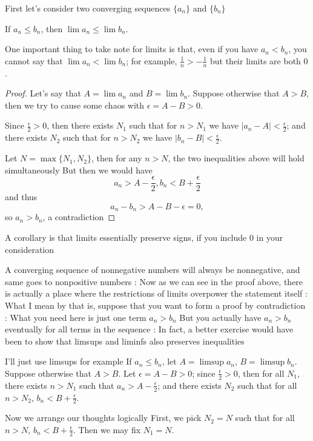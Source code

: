 First let's consider two converging sequences $\{a_n\}$ and $\{b_n\}$

If $a_n \le b_n$, then $\lim a_n \le \lim b_n$.

\begin{remark}
One important thing to take note for limits is that, even if you have $a_n<b_n$, you cannot say that $\lim a_n<\lim b_n$; for example, $\frac{1}{n}>-\frac{1}{n}$ but their limits are both $0$.
\end{remark}

\begin{proof}
Let's say that $A=\lim a_n$ and $B=\lim b_n$. Suppose otherwise that $A>B$, then we try to cause some chaos with $\epsilon=A-B>0$.

Since $\frac{\epsilon}{2}>0$, then there exists $N_1$ such that for $n>N_1$ we have $|a_n-A|<\frac{\epsilon}{2}$; and there exists $N_2$ such that for $n>N_2$ we have $|b_n-B|<\frac{\epsilon}{2}$.

Let $N=\max\{N_1,N_2\}$, then for any $n>N$, the two inequalities above will hold simultaneously
But then we would have
\[ a_n>A-\frac{\epsilon}{2}, b_n<B+\frac{\epsilon}{2} \]
and thus
\[ a_n-b_n>A-B-\epsilon=0, \]
so $a_n>b_n$, a contradiction
\end{proof}

A corollary is that limits essentially preserve signs, if you include 0 in your consideration

A converging sequence of nonnegative numbers will always be nonnegative, and same goes to nonpositive numbers
:
Now as we can see in the proof above, there is actually a place where the restrictions of limits overpower the statement itself
:
What I mean by that is, suppose that you want to form a proof by contradiction
:
What you need here is just one term $a_n>b_n$
But you actually have $a_n>b_n$ eventually for all terms in the sequence
:
In fact, a better exercise would have been to show that limsups and liminfs also preserves inequalities

I'll just use limsups for example
If $a_n\le b_n$, let $A=\limsup a_n$, $B=\limsup b_n$. Suppose otherwise that $A>B$. Let $\epsilon=A-B>0$; since $\frac{\epsilon}{2}>0$, then for all $N_1$, there exists $n>N_1$ such that $a_n>A-\frac{\epsilon}{2}$; and there exists $N_2$ such that for all $n>N_2$, $b_n<B+\frac{\epsilon}{2}$.

Now we arrange our thoughts logically
First, we pick $N_2=N$ such that for all $n>N$, $b_n<B+\frac{\epsilon}{2}$. Then we may fix $N_1=N$.

